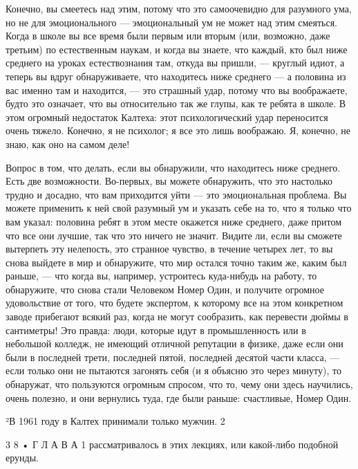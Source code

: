 \documentclass[10pt,oneside]{article}
\begin{document}
Конечно, вы смеетесь над этим, потому что это самоочевидно для разумного ума, но не для эмоционального --- эмоциональный ум не может над этим смеяться. Когда в школе вы все время были первым или вторым (или, возможно, даже третьим) по естественным наукам, и когда вы знаете, что каждый, кто был ниже среднего на уроках естествознания там, откуда вы пришли, --- круглый идиот, а теперь вы вдруг обнаруживаете, что находитесь ниже среднего --- а половина из вас именно там и находится, --- это страшный удар, потому что вы воображаете, будто это означает, что вы относительно так же глупы, как те ребята в школе. В этом огромный недостаток Калтеха: этот психологический удар переносится очень тяжело. Конечно, я не психолог; я все это лишь воображаю. Я, конечно, не знаю, как оно на самом деле!\par

Вопрос в том, что делать, если вы обнаружили, что находитесь ниже среднего. Есть две возможности. Во-первых, вы можете обнаружить, что это настолько трудно и досадно, что вам приходится уйти --- это эмоциональная проблема. Вы можете применить к ней свой разумный ум и указать себе на то, что я только что вам указал: половина ребят в этом месте окажется ниже среднего, даже притом что все они лучшие, так что это ничего не значит. Видите ли, если вы сможете вытерпеть эту нелепость, это странное чувство, в течение четырех лет, то вы снова выйдете в мир и обнаружите, что мир остался точно таким же, каким был раньше, --- что когда вы, например, устроитесь куда-нибудь на работу, то обнаружите, что снова стали Человеком Номер Один, и получите огромное удовольствие от того, что будете экспертом, к которому все на этом конкретном заводе прибегают всякий раз, когда не могут сообразить, как перевести дюймы в сантиметры! Это правда: люди, которые идут в промышленность или в небольшой колледж, не имеющий отличной репутации в физике, даже если они были в последней трети, последней пятой, последней десятой части класса, --- если только они не пытаются загонять себя (и я объясню это через минуту), то обнаружат, что пользуются огромным спросом, что то, чему они здесь научились, очень полезно, и они вернулись туда, где были раньше: счастливые, Номер Один.\par

²В 1961 году в Калтех принимали только мужчин. 2\par

3 8 • Г Л А В А  1 рассматривалось в этих лекциях, или какой-либо подобной ерунды.\par
\end{document}
